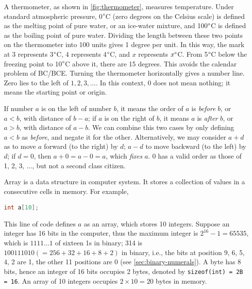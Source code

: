 \documentclass[b5paper]{article}
\begin{document}
A thermometer, as shown in \cref{fig:thermometer}, measures temperature. Under standard atmospheric pressure, 0$\degree$C (zero degrees on the Celsius scale) is defined as the melting point of pure water, or an ice-water mixture, and 100$\degree$C is defined as the boiling point of pure water. Dividing the length between these two points on the thermometer into 100 units gives 1 degree per unit. In this way, the mark at 3 represents 3$\degree$C, 4 represents 4$\degree$C, and $x$ represents $x\degree$C. From 5$\degree$C below the freezing point to 10$\degree$C above it, there are 15 degrees. This avoids the calendar problem of BC/BCE. Turning the thermometer horizontally gives a number line. Zero lies to the left of $1, 2, 3, \dotsc$. In this context, 0 does not mean nothing; it means the starting point or origin.

\begin{center}
\end{center}

\label{sec:zero-as-ordinal} 
If number $a$ is on the left of number $b$, it means the order of $a$ is {\em before} $b$, or $a < b$, with distance of $b - a$; if $a$ is on the right of $b$, it means $a$ is {\em after} $b$, or $a > b$, with distance of $a - b$. We can combine this two cases by only defining $a < b$ as {\em before}, and negate it for the other. Alternatively, we may consider $a + d$ as to move $a$ forward (to the right) by $d$; $a - d$ to move backward (to the left) by $d$; if $d = 0$, then $a + 0 = a - 0 = a$, which {\em fixes} $a$. 0 has a valid order as those of 1, 2, 3, ..., but not a second class citizen.

Array is a data structure in computer system. It stores a collection of values in a consecutive cells in memory. For example,

\begin{lstlisting}[language=C, frame=single]
int a[10];
\end{lstlisting}

This line of code defines $a$ as an array, which stores 10 integers. Suppose an integer has 16 bits in the computer, thus the maximum integer is $2^{16}-1 = 65535$, which is $1111...1$ of sixteen 1s in binary; 314 is $100111010(=256 + 32 + 16 + 8 + 2)$ in binary, i.e., the bits at position 9, 6, 5, 4, 2 are 1, the other 11 positions are 0 (see \cref{sec:binary-numerals}). A byte has 8 bits, hence an integer of 16 bits occupies 2 bytes, denoted by \lstinline|sizeof(int) = 2B = 16|. An array of 10 integers occupies $2 \times 10 = 20$ bytes in memory.
\end{document}
